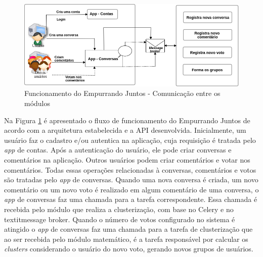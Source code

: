 \vfill
\pagebreak
\begin{figure}[bt!]
\centering
\includegraphics[scale=0.6]{figuras/resumo_ej_api.png}
\caption{Funcionamento do Empurrando Juntos - Comunicação entre os módulos}
\label{fig:resumo_ej_api}
\end{figure}


Na Figura \ref{fig:resumo_ej_api} é apresentado o fluxo de funcionamento do Empurrando Juntos de acordo com a arquitetura
estabelecida e a API desenvolvida. Inicialmente, um usuário faz o cadastro e/ou autentica na aplicação, cuja requisição é tratada pelo \textit{app} de contas.
Após a autenticação do usuário, ele pode criar conversas e comentários na aplicação. Outros usuários podem criar comentários e votar
nos comentários. Todas essas operações relacionadas à conversas, comentários e votos são tratadas pelo \textit{app} de conversas.
Quando uma nova conversa é criada, um novo comentário ou um novo voto é realizado em algum comentário de uma conversa, o 
\textit{app} de conversas faz uma chamada para a tarefa correspondente. Essa chamada é recebida pelo módulo que realiza a clusterização, 
com base no Celery e no textit{message broker}. Quando o número de votos configurado no sistema é atingido o \textit{app} de conversas
faz uma chamada para a tarefa de clusterização que ao ser recebida pelo módulo matemático, é a tarefa responsável por calcular
os \textit{clusters} considerando o usuário do novo voto, gerando novos grupos de usuários.